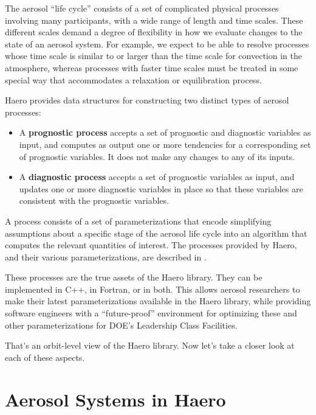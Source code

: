 The aerosol ``life cycle'' consists of a set of complicated physical processes
involving many participants, with a wide range of length and time scales. These
different scales demand a degree of flexibility in how we evaluate changes to
the state of an aerosol system. For example, we expect to be able to resolve
processes whose time scale is similar to or larger than the time scale for
convection in the atmosphere, whereas processes with faster time scales must be
treated in some special way that accommodates a relaxation or equilibration
process.

Haero provides data structures for constructing two distinct types of aerosol
processes:

\begin{itemize}
  \item A {\bf prognostic process} accepts a set of prognostic and diagnostic
        variables as input, and computes as output one or more tendencies for a
        corresponding set of prognostic variables. It does not make any changes
        to any of its inputs.
  \item A {\bf diagnostic process} accepts a set of prognostic variables as
        input, and updates one or more diagnostic variables in place so that
        these variables are consistent with the prognostic variables.
\end{itemize}

A process consists of a set of parameterizations that encode simplifying
assumptions about a specific stage of the aerosol life cycle into an algorithm
that computes the relevant quantities of interest. The processes provided by
Haero, and their various parameterizations, are described in .

These processes are the true assets of the Haero library. They can be
implemented in C++, in Fortran, or in both. This allows aerosol researchers to
make their latest parameterizations available in the Haero library, while
providing software engineers with a ``future-proof'' environment for optimizing
these and other parameterizations for DOE's Leadership Class Facilities.

That's an orbit-level view of the Haero library. Now let's take a closer look at
each of these aspects.

\section{Aerosol Systems in Haero}

